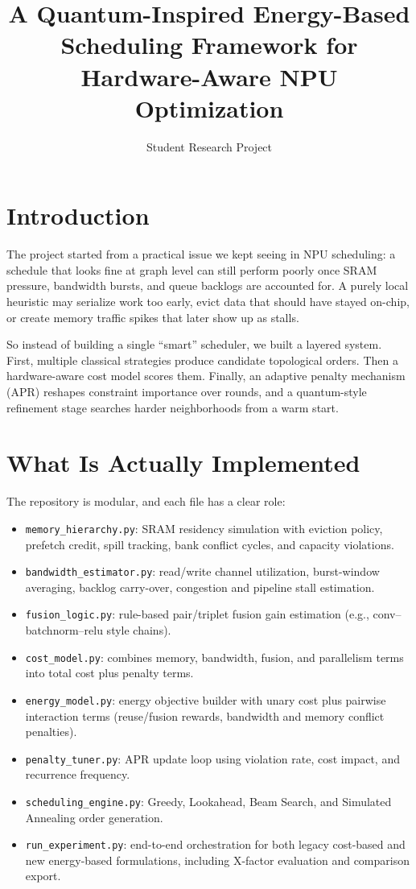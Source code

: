 \documentclass[11pt]{article}
\title{A Quantum-Inspired Energy-Based Scheduling Framework for Hardware-Aware NPU Optimization}
\author{Student Research Project}
\date{}
\begin{document}
\maketitle

\section{Introduction}
The project started from a practical issue we kept seeing in NPU scheduling: a schedule that looks fine at graph level can still perform poorly once SRAM pressure, bandwidth bursts, and queue backlogs are accounted for. A purely local heuristic may serialize work too early, evict data that should have stayed on-chip, or create memory traffic spikes that later show up as stalls.

So instead of building a single ``smart'' scheduler, we built a layered system. First, multiple classical strategies produce candidate topological orders. Then a hardware-aware cost model scores them. Finally, an adaptive penalty mechanism (APR) reshapes constraint importance over rounds, and a quantum-style refinement stage searches harder neighborhoods from a warm start.

\section{What Is Actually Implemented}
The repository is modular, and each file has a clear role:
\begin{itemize}
    \item \texttt{memory\_hierarchy.py}: SRAM residency simulation with eviction policy, prefetch credit, spill tracking, bank conflict cycles, and capacity violations.
    \item \texttt{bandwidth\_estimator.py}: read/write channel utilization, burst-window averaging, backlog carry-over, congestion and pipeline stall estimation.
    \item \texttt{fusion\_logic.py}: rule-based pair/triplet fusion gain estimation (e.g., conv--batchnorm--relu style chains).
    \item \texttt{cost\_model.py}: combines memory, bandwidth, fusion, and parallelism terms into total cost plus penalty terms.
    \item \texttt{energy\_model.py}: energy objective builder with unary cost plus pairwise interaction terms (reuse/fusion rewards, bandwidth and memory conflict penalties).
    \item \texttt{penalty\_tuner.py}: APR update loop using violation rate, cost impact, and recurrence frequency.
    \item \texttt{scheduling\_engine.py}: Greedy, Lookahead, Beam Search, and Simulated Annealing order generation.
    \item \texttt{run\_experiment.py}: end-to-end orchestration for both legacy cost-based and new energy-based formulations, including X-factor evaluation and comparison export.
\end{itemize}
\end{document}
